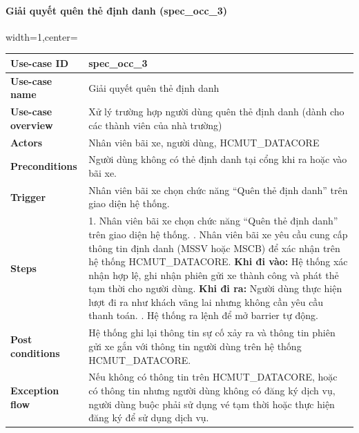 \paragraph{ Giải quyết quên thẻ định danh (spec\_occ\_3)}
\begin{adjustbox}{width=1\textwidth,center=\textwidth}
\small
\begin{tabular}{|>{\centering\arraybackslash}m{3.5cm}|m{13.2cm}|}
\hline
\textbf{Use-case ID} & spec\_occ\_3   \\ \hline
\textbf{Use-case name} & Giải quyết quên thẻ định danh   \\ \hline
\textbf{Use-case overview} & Xử lý trường hợp người dùng quên thẻ định danh (dành cho các thành viên của nhà trường)  \\ \hline
\textbf{Actors} & Nhân viên bãi xe, người dùng, HCMUT\_DATACORE   \\ \hline
\textbf{Preconditions} & Người dùng không có thẻ định danh tại cổng khi ra hoặc vào bãi xe. \\ \hline
\textbf{Trigger} & Nhân viên bãi xe chọn chức năng “Quên thẻ định danh” trên giao diện hệ thống. \\ \hline
\textbf{Steps} & 
1. Nhân viên bãi xe chọn chức năng “Quên thẻ định danh” trên giao diện hệ thống. \newline
2. Nhân viên bãi xe yêu cầu cung cấp thông tin định danh (MSSV hoặc MSCB) để xác nhận trên hệ thống HCMUT\_DATACORE. \newline
3.1 \textbf{Khi đi vào:} Hệ thống xác nhận hợp lệ, ghi nhận phiên gửi xe thành công và phát thẻ tạm thời cho người dùng. \newline
3.2 \textbf{Khi đi ra:} Người dùng thực hiện lượt đi ra như khách vãng lai nhưng không cần yêu cầu thanh toán.  \newline
4. Hệ thống ra lệnh để mở barrier tự động. \\ \hline
\textbf{Post conditions} & Hệ thống ghi lại thông tin sự cố xảy ra và thông tin phiên gửi xe gắn với thông tin người dùng trên hệ thống HCMUT\_DATACORE. \\ \hline
\textbf{Exception flow} & Nếu không có thông tin trên HCMUT\_DATACORE, hoặc có thông tin nhưng người dùng không có đăng ký dịch vụ, người dùng buộc phải sử dụng vé tạm thời hoặc thực hiện đăng ký để sử dụng dịch vụ. \\ \hline
\end{tabular}
\end{adjustbox}

